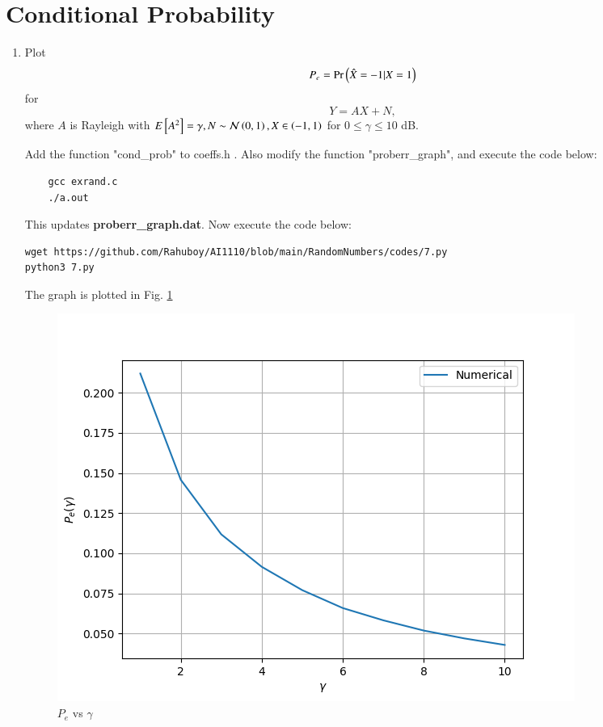 \documentclass[journal,12pt,twocolumn]{IEEEtran}
\renewcommand\thesection{\arabic{section}}
\begin{document}
\section{Conditional Probability}
\begin{enumerate}[label=\thesection.\arabic*
,ref=\thesection.\theenumi]
\item
\label{ch4_sim}
Plot 
\begin{equation}
P_e = \Pr\left(\hat{X} = -1|X=1\right)
\end{equation}
%
for 
\begin{equation}
Y = AX+N,
\end{equation}
where $A$ is Rayleigh with $E{}\left[A^2\right] = \gamma, N \sim \mathcal{N}\left(0,1\right), X \in \left(-1,1\right)$ for $0 \le \gamma \le 10$ dB.
%
\\
\solution

Add the function "cond\_prob" to coeffs.h . Also modify the function "proberr\_graph", and execute the code
below:
\begin{lstlisting}
    gcc exrand.c
    ./a.out
\end{lstlisting}

This updates \textbf{proberr\_graph.dat}. Now execute the code below:

\begin{lstlisting}
wget https://github.com/Rahuboy/AI1110/blob/main/RandomNumbers/codes/7.py
python3 7.py
\end{lstlisting}

The graph is plotted in Fig. \ref{fig:ErrorGraph2_Sim}


\begin{figure}
    \centering
    \includegraphics[width=\columnwidth]{./figures/ErrorGraph2_Sim.png}
    \caption{$P_e$ vs $\gamma$}
    \label{fig:ErrorGraph2_Sim}
    \end{figure}




\end{enumerate}
\end{document}
